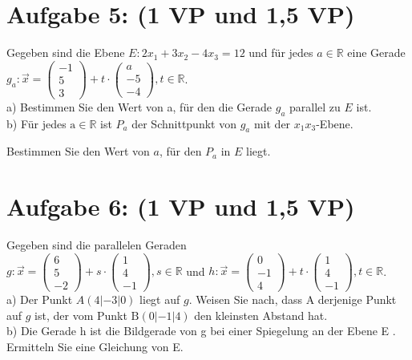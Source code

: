 \documentclass[10pt]{article}
\begin{document}
\section*{Aufgabe 5: (1 VP und 1,5 VP)}
Gegeben sind die Ebene $E: 2 x_{1}+3 x_{2}-4 x_{3}=12$ und für jedes $a \in \mathbb{R}$ eine Gerade $g_{a}: \vec{x}=\left(\begin{array}{c}-1 \\ 5 \\ 3\end{array}\right)+t \cdot\left(\begin{array}{c}a \\ -5 \\ -4\end{array}\right), t \in \mathbb{R}$.\\
a) Bestimmen Sie den Wert von a, für den die Gerade $g_{a}$ parallel zu $E$ ist.\\
b) Für jedes $\mathrm{a} \in \mathbb{R}$ ist $P_{a}$ der Schnittpunkt von $g_{a}$ mit der $x_{1} x_{3}$-Ebene.

Bestimmen Sie den Wert von $a$, für den $P_{a}$ in $E$ liegt.

\section*{Aufgabe 6: (1 VP und 1,5 VP)}
Gegeben sind die parallelen Geraden\\
$g: \vec{x}=\left(\begin{array}{c}6 \\ 5 \\ -2\end{array}\right)+s \cdot\left(\begin{array}{c}1 \\ 4 \\ -1\end{array}\right), s \in \mathbb{R}$ und $h: \vec{x}=\left(\begin{array}{c}0 \\ -1 \\ 4\end{array}\right)+t \cdot\left(\begin{array}{c}1 \\ 4 \\ -1\end{array}\right), t \in \mathbb{R}$.\\
a) Der Punkt $A(4|-3| 0)$ liegt auf $g$. Weisen Sie nach, dass A derjenige Punkt auf $g$ ist, der vom Punkt $\mathrm{B}(0|-1| 4)$ den kleinsten Abstand hat.\\
b) Die Gerade h ist die Bildgerade von g bei einer Spiegelung an der Ebene E . Ermitteln Sie eine Gleichung von E.
\end{document}

